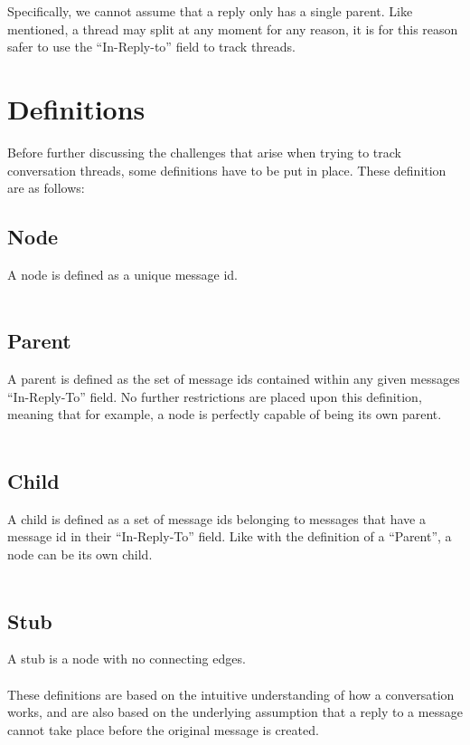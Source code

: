 \documentclass[a4paper,english]{report}
\begin{document}
Specifically, we cannot assume that a reply only has a single parent. Like mentioned, a thread may split at any moment for any reason, it is for this reason safer to use the “In-Reply-to” field to track threads. \\


\section{Definitions}

Before further discussing the challenges that arise when trying to track conversation threads, some definitions have to be put in place.
These definition are as follows:\\


\subsection{Node} 
A node is defined as a unique message id.\\\\


\subsection{Parent}
A parent is defined as the set of message ids contained within any given messages “In-Reply-To” field. No further restrictions are placed upon this definition, meaning that for example, a node is perfectly capable of being its own parent. \\\\


\subsection{Child}
A child is defined as a set of message ids belonging to messages that have a message id in their “In-Reply-To” field. Like with the definition of a “Parent”, a node can be its own child.\\\\

\subsection{Stub}
A stub is a node with no connecting edges.\\\\

These definitions are based on the intuitive understanding of how a conversation works, and are also based on the underlying assumption that a reply to a message cannot take place before the original message is created. \\ 
\end{document}
